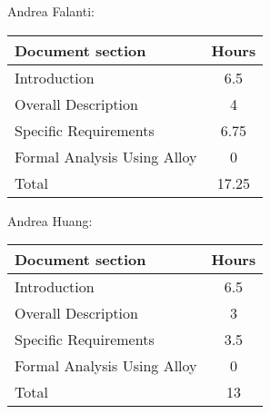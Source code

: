 Andrea Falanti:

\begin{tabular}{|l|c|}
    \hline
    Document section & Hours \\
    \hline
     Introduction & 6.5\\
     Overall Description & 4\\
     Specific Requirements & 6.75\\
     Formal Analysis Using Alloy & 0\\
     \hline
     Total & 17.25\\
     \hline
\end{tabular}
\vskip 0.3in

Andrea Huang:

\begin{tabular}{|l|c|}
    \hline
    Document section & Hours \\
    \hline
     Introduction &  6.5\\
     Overall Description & 3\\
     Specific Requirements & 3.5\\
     Formal Analysis Using Alloy & 0\\
     \hline
     Total & 13\\
     \hline
\end{tabular}
